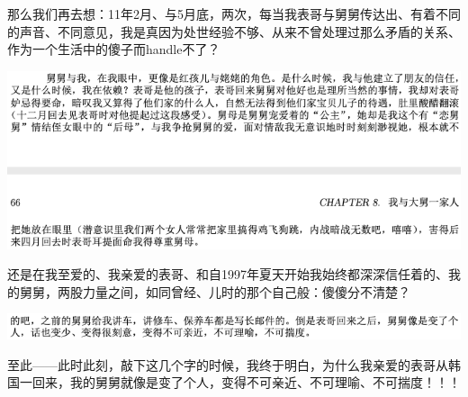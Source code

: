 \documentclass[9pt, b5paper]{article}
\begin{document}
那么我们再去想：11年2月、与5月底，两次，每当我表哥与舅舅传达出、有着不同的声音、不同意见，我是真因为处世经验不够、从来不曾处理过那么矛盾的关系、作为一个生活中的傻子而handle不了？

\begin{center}
\includegraphics[width=.9\linewidth]{./pic/backups_plans_20210423_103059.png}
\end{center}

还是在我至爱的、我亲爱的表哥、和自1997年夏天开始我始终都深深信任着的、我的舅舅，两股力量之间，如同曾经、儿时的那个自己般：傻傻分不清楚？

\begin{center}
\includegraphics[width=.9\linewidth]{./pic/backups_plans_20210422_232937.png}
\end{center}

至此——此时此刻，敲下这几个字的时候，我终于明白，为什么我亲爱的表哥从韩国一回来，我的舅舅就像是变了个人，变得不可亲近、不可理喻、不可揣度！！！
\end{document}
